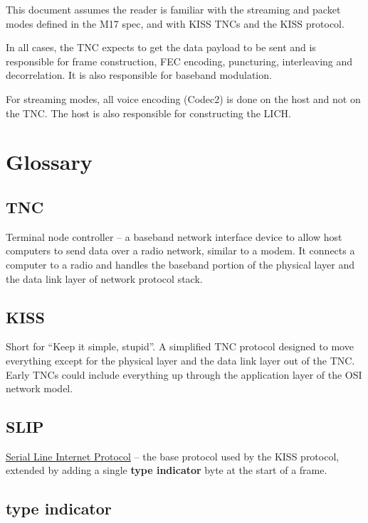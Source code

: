 \documentclass[a4paper,11pt,oneside]{article}
\begin{document}
This document assumes the reader is familiar with the streaming and packet modes defined in the M17 spec, and with KISS TNCs and the KISS protocol.

In all cases, the TNC expects to get the data payload to be sent and is responsible for frame construction, FEC encoding, puncturing, interleaving and decorrelation. It is also responsible for baseband modulation.

For streaming modes, all voice encoding (Codec2) is done on the host and not on the TNC. The host is also responsible for constructing the LICH.

\section{Glossary}

\subsection{TNC}

Terminal node controller -- a baseband network interface device to allow host computers to send data over a radio network, similar to a modem. It connects a computer to a radio and handles the baseband portion of the physical layer and the data link layer of network protocol stack.

\subsection{KISS}

Short for ``Keep it simple, stupid''. A simplified TNC protocol designed to move everything except for the physical layer and the data link layer out of the TNC. Early TNCs could include everything up through the application layer of the OSI network model.

\subsection{SLIP}

\href{https://en.wikipedia.org/wiki/Serial_Line_Internet_Protocol}{Serial Line Internet Protocol} -- the base protocol used by the KISS protocol, extended by adding a single \textbf{type indicator} byte at the start of a frame.

\subsection{type indicator}
\end{document}
